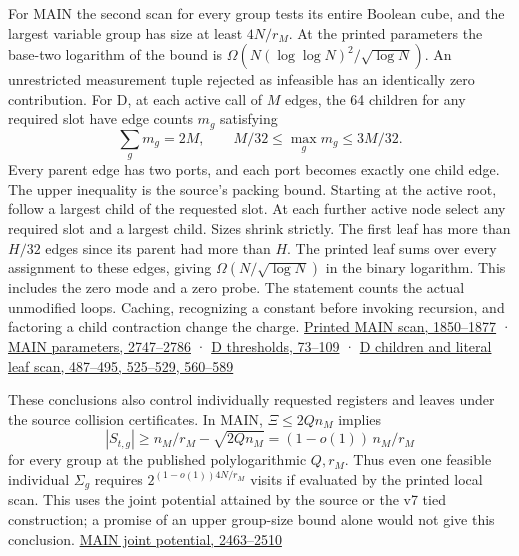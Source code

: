 \documentclass[
  11pt,
]{article}
\begin{document}
For MAIN the second scan for every group tests its entire Boolean cube,
and the largest variable group has size at least \(4N/r_M\). At the
printed parameters the base-two logarithm of the bound is
\(\Omega(N(\log\log N)^2/\sqrt{\log N})\). An unrestricted measurement
tuple rejected as infeasible has an identically zero contribution. For
D, at each active call of \(M\) edges, the 64 children for any required
slot have edge counts \(m_g\) satisfying \[
 \sum_g m_g=2M,\qquad M/32\le\max_gm_g\le 3M/32.
\tag{N2}
\] Every parent edge has two ports, and each port becomes exactly one
child edge. The upper inequality is the source's packing bound. Starting
at the active root, follow a largest child of the requested slot. At
each further active node select any required slot and a largest child.
Sizes shrink strictly. The first leaf has more than \(H/32\) edges since
its parent had more than \(H\). The printed leaf sums over every
assignment to these edges, giving \(\Omega(N/\sqrt{\log N})\) in the
binary logarithm. This includes the zero mode and a zero probe. The
statement counts the actual unmodified loops. Caching, recognizing a
constant before invoking recursion, and factoring a child contraction
change the charge.
\href{https://github.com/openai/math/blob/main/preprints/The-Exponential-Time-Hypothesis-is-False-October-25-2026/build/main_full_version.tex\#L1850}{Printed
MAIN scan, 1850--1877} ·
\href{https://github.com/openai/math/blob/main/preprints/The-Exponential-Time-Hypothesis-is-False-October-25-2026/build/main_full_version.tex\#L2747}{MAIN
parameters, 2747--2786} ·
\href{https://github.com/openai/math/blob/main/preprints/The-Exponential-Time-Hypothesis-is-False-October-25-2026/build/quantitative-contraction.tex\#L73}{D
thresholds, 73--109} ·
\href{https://github.com/openai/math/blob/main/preprints/The-Exponential-Time-Hypothesis-is-False-October-25-2026/build/quantitative-contraction.tex\#L560}{D
children and literal leaf scan, 487--495, 525--529, 560--589}

These conclusions also control individually requested registers and
leaves under the source collision certificates. In MAIN,
\(\Xi\le 2Qn_M\) implies \[
 |S_{t,g}| \ge n_M/r_M-\sqrt{2Qn_M}
       =(1-o(1))\, n_M/r_M
\] for every group at the published polylogarithmic \(Q,r_M\). Thus even
one feasible individual \(\Sigma_g\) requires \(2^{(1-o(1))4N/r_M}\)
visits if evaluated by the printed local scan. This uses the joint
potential attained by the source or the v7 tied construction; a promise
of an upper group-size bound alone would not give this conclusion.
\href{https://github.com/openai/math/blob/main/preprints/The-Exponential-Time-Hypothesis-is-False-October-25-2026/build/main_full_version.tex\#L2463}{MAIN
joint potential, 2463--2510}
\end{document}

